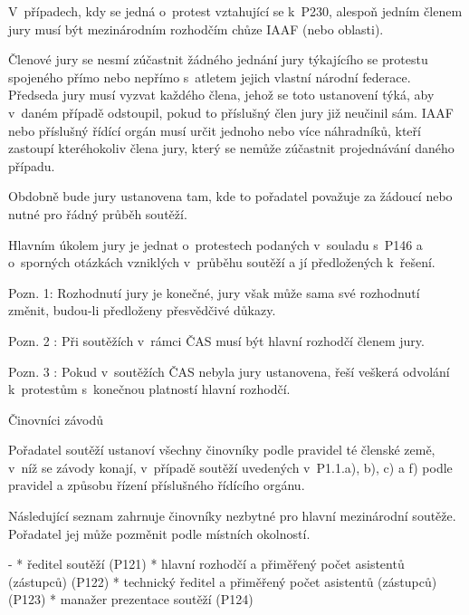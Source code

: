 V~případech, kdy se jedná o~protest vztahující se k~P230, alespoň jedním členem jury musí být mezinárodním rozhodčím chůze IAAF (nebo oblasti).

Členové jury se nesmí zúčastnit žádného jednání jury týkajícího se protestu spojeného přímo nebo nepřímo s~atletem jejich vlastní národní federace.
Předseda jury musí vyzvat každého člena, jehož se toto ustanovení týká, aby v~daném případě odstoupil, pokud to příslušný člen jury již neučinil sám.
IAAF nebo příslušný řídící orgán musí určit jednoho nebo více náhradníků, kteří zastoupí kteréhokoliv člena jury, který se nemůže zúčastnit projednávání daného případu.

Obdobně bude jury ustanovena tam, kde to pořadatel považuje za žádoucí nebo nutné pro řádný průběh soutěží.

Hlavním úkolem jury je jednat o~protestech podaných v~souladu s~P146 a o~sporných otázkách vzniklých v~průběhu soutěží a jí předložených k~řešení.

Pozn. 1: Rozhodnutí jury je konečné, jury však může sama své rozhodnutí změnit, budou-li předloženy přesvědčivé důkazy.

Pozn. 2 : Při soutěžích v~rámci ČAS musí být hlavní rozhodčí členem jury.

Pozn. 3 : Pokud v~soutěžích ČAS nebyla jury ustanovena, řeší veškerá odvolání k~protestům s~konečnou platností hlavní rozhodčí.

\secc Činovníci závodů

Pořadatel soutěží ustanoví všechny činovníky podle pravidel té členské země, v~níž se závody konají, v~případě soutěží uvedených v~P1.1.a), b), c) a f) podle pravidel a způsobu řízení příslušného řídícího orgánu.

Následující seznam zahrnuje činovníky nezbytné pro hlavní mezinárodní soutěže.
Pořadatel jej může pozměnit podle místních okolností.

\begitems \style -
* ředitel soutěží (P121)
* hlavní rozhodčí a přiměřený počet asistentů (zástupců) (P122)
* technický ředitel a přiměřený počet asistentů (zástupců) (P123)
* manažer prezentace soutěží (P124)
\enditems

